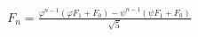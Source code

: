 \documentclass[preview]{standalone}
\begin{document}
\begin{align*}
F_n = \frac{\varphi^{n-1}(\varphi F_1 + F_0) - \psi^{n-1}(\psi F_1 + F_0)}{\sqrt{5}}
\end{align*}
\end{document}
